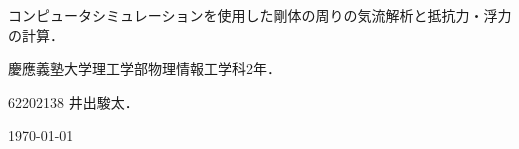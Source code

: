 \documentclass[main]{subfiles}
\begin{document}
\begin{titlepage}
    \centering
    \Large
    コンピュータシミュレーションを使用した剛体の周りの気流解析と抵抗力・浮力の計算．

    \normalsize
    \vspace{10pt}
    慶應義塾大学理工学部物理情報工学科2年．

    62202138 井出駿太．

    \vspace{10pt}
    \today

\end{titlepage}
\end{document}
